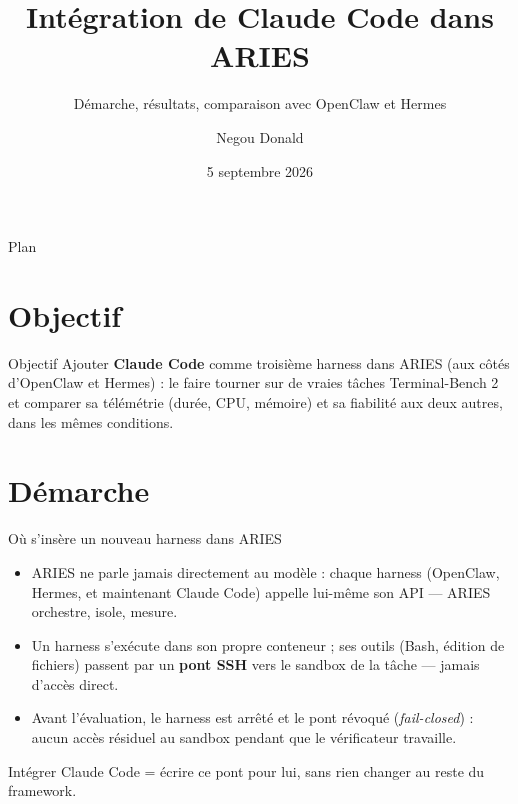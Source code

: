 \documentclass[aspectratio=169]{beamer}
\title{Intégration de Claude Code dans ARIES}
\subtitle{Démarche, résultats, comparaison avec OpenClaw et Hermes}
\author{Negou Donald}
\institute{Stage --- ARIES (Agent Runtime \& Infrastructure Experimentation System)}
\date{5 septembre 2026}
\begin{document}
\frame{\titlepage}

\begin{frame}{Plan}
\tableofcontents
\end{frame}

\section{Objectif}

\begin{frame}{Objectif}
Ajouter \textbf{Claude Code} comme troisième harness dans ARIES (aux côtés
d'OpenClaw et Hermes) : le faire tourner sur de vraies tâches
Terminal-Bench 2 et comparer sa télémétrie (durée, CPU, mémoire) et sa
fiabilité aux deux autres, dans les mêmes conditions.
\end{frame}

\section{Démarche}

\begin{frame}{Où s'insère un nouveau harness dans ARIES}
\begin{itemize}
  \item ARIES ne parle jamais directement au modèle : chaque harness
        (OpenClaw, Hermes, et maintenant Claude Code) appelle lui-même son
        API --- ARIES orchestre, isole, mesure.
  \item Un harness s'exécute dans son propre conteneur ; ses outils (Bash,
        édition de fichiers) passent par un \textbf{pont SSH} vers le sandbox
        de la tâche --- jamais d'accès direct.
  \item Avant l'évaluation, le harness est arrêté et le pont révoqué
        (\emph{fail-closed}) : aucun accès résiduel au sandbox pendant que le
        vérificateur travaille.
\end{itemize}
\vspace{0.3cm}
Intégrer Claude Code = écrire ce pont pour lui, sans rien changer au reste
du framework.
\end{frame}
\end{document}

